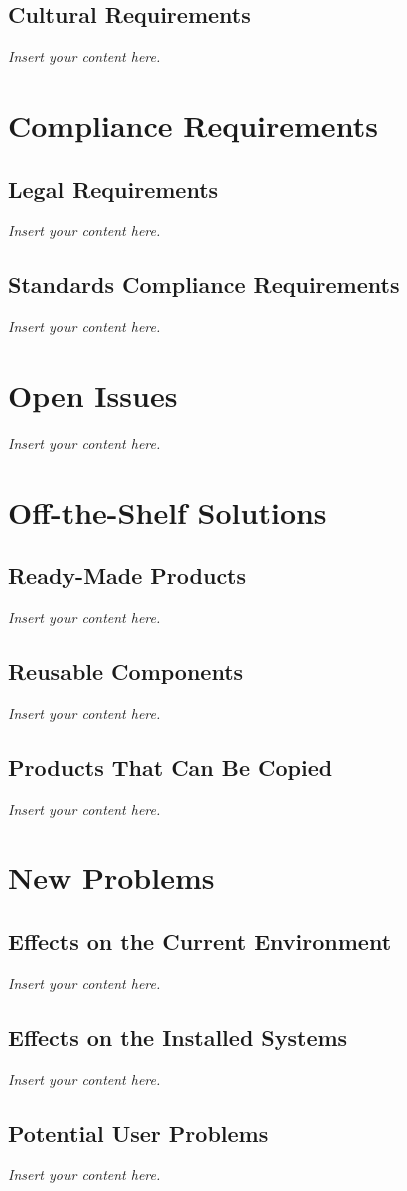 \documentclass[12pt]{article}
\newcommand{\lips}{\textit{Insert your content here.}}
\begin{document}
\subsection{Cultural Requirements}
\lips

\section{Compliance Requirements}
\subsection{Legal Requirements}
\lips
\subsection{Standards Compliance Requirements}
\lips

\section{Open Issues}
\lips

\section{Off-the-Shelf Solutions}
\subsection{Ready-Made Products}
\lips
\subsection{Reusable Components}
\lips
\subsection{Products That Can Be Copied}
\lips

\section{New Problems}
\subsection{Effects on the Current Environment}
\lips
\subsection{Effects on the Installed Systems}
\lips
\subsection{Potential User Problems}
\lips
\end{document}
